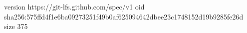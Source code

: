 version https://git-lfs.github.com/spec/v1
oid sha256:575ffd4f1e6ba09273251f49b0af625094642dbee23c1748152d19b9285fe26d
size 375
